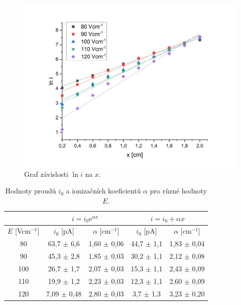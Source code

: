 \documentclass[a4paper,12pt]{article}
\newcommand{\e}{\text{e}}
\begin{document}
\begin{figure}[h!]
	\centering
	\includegraphics[width=145mm]{lni.png}
	\caption{Graf závislosti $\ln i$ na $x$.}
	\label{lni}
\end{figure}


\begin{center}
	\begin{table}[h]
		\centering
		\caption{Hodnoty proudů $i_0$ a ionizačních koeficientů $\alpha$ pro různé hodnoty $E$.}
		\label{tab1}
		\begin{tabular}{|c|c|c|c|c|} \hline
			\multicolumn{1}{|c|}{}  & \multicolumn{2}{c|}{$i = i_0 \e^{\alpha 
			x}$}& \multicolumn{2}{c|}{$i = i_0 + \alpha x$}  \\ \hline
			$E$ [Vcm$^{-1}$] & $i_0$ [pA] & $\alpha$ [cm$^{-1}$] & $i_0$ [pA] & $\alpha$ [cm$^{-1}$] \\ \hline
			80 & 63,7 $\pm$ 6,6 & 1,60 $\pm$ 0,06 & 44,7 $\pm$ 1,1 & 1,83 $\pm$ 
			0,04\\ \hline
			90 & 45,3 $\pm$ 2,8 & 1,85 $\pm$ 0,03& 30,2 $\pm$ 1,1 & 2,12 $\pm$ 
			0,08\\ \hline
			100 & 26,7 $\pm$ 1,7 & 2,07 $\pm$ 0,03 & 15,3 $\pm$ 1,1 & 2,43 
			$\pm$ 0,09\\ \hline
			110 & 19,9 $\pm$ 1,2 & 2,23 $\pm$ 0,03 & 12,3 $\pm$ 1,1 & 2,60 
			$\pm$ 0,09 \\ \hline
			120 & 7,09 $\pm$ 0,48 & 2,80 $\pm$ 0,03 & 3,7 $\pm$ 1,3 & 3,23 
			$\pm$ 0,20 \\ \hline
			
		\end{tabular}
	\end{table}
\end{center}
\end{document}
